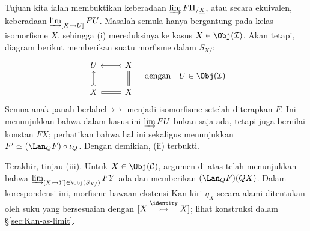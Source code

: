 \begin{bukti}
	Tujuan kita ialah membuktikan keberadaan
	$\varinjlim F\Pi_{/\underline{X}}$, atau secara ekuivalen, keberadaan
	$\varinjlim_{[X \rightarrowtail U]} FU$. Masalah semula hanya bergantung
	pada kelas isomorfisme $\underline{X}$, sehingga (i) mereduksinya ke
	kasus $X \in \Obj(\mathcal{I})$. Akan tetapi, diagram berikut memberikan
	suatu morfisme dalam $S_{X/}$:
	\begin{equation*}
		\begin{tikzcd}
			U & X \arrow[rightarrowtail, l] \\
			X \arrow[rightarrowtail, u] & X \arrow[equal, l] \arrow[equal, u]
		\end{tikzcd} \quad
		\text{dengan} \quad U \in \Obj(\mathcal{I})
	\end{equation*}
	Semua anak panah berlabel $\rightarrowtail$ menjadi isomorfisme setelah
	diterapkan $F$. Ini menunjukkan bahwa dalam kasus ini
	$\varinjlim FU$ bukan saja ada, tetapi juga bernilai konstan $FX$;
	perhatikan bahwa hal ini sekaligus menunjukkan
	$F' \simeq (\Lan_Q F) \circ \iota_Q$. Dengan demikian, (ii) terbukti.

	Terakhir, tinjau (iii). Untuk $X \in \Obj(\mathcal{C})$, argumen di atas
	telah menunjukkan bahwa
	$\varinjlim_{[X \rightarrowtail Y] \in \Obj(S_{X/})} FY$ ada dan
	memberikan $(\Lan_Q F)(QX)$. Dalam korespondensi ini, morfisme bawaan
	ekstensi Kan kiri $\eta_X$ secara alami ditentukan oleh suku yang
	bersesuaian dengan $[X \stackrel{\identity}{\rightarrowtail} X]$; lihat
	konstruksi dalam \S\ref{sec:Kan-as-limit}.
\end{bukti}

